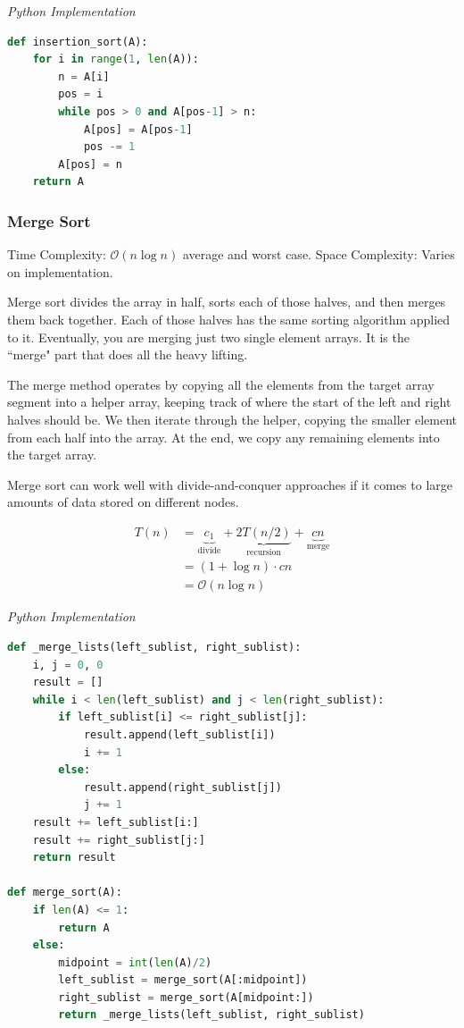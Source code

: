\documentclass{article}
\newcommand{\bigO}{\mathcal{O}}
\begin{document}
\vspace{8pt} \emph{Python Implementation}
\begin{lstlisting}[language=Python]
def insertion_sort(A):
    for i in range(1, len(A)):
        n = A[i]
        pos = i
        while pos > 0 and A[pos-1] > n:
            A[pos] = A[pos-1]
            pos -= 1
        A[pos] = n
    return A
\end{lstlisting}

    \subsubsection{Merge Sort}
    Time Complexity: $\bigO( n \log n )$ average and worst case. Space Complexity: Varies on implementation. 
    
    Merge sort divides the array in half, sorts each of those halves, and then merges them back together. Each of those halves has the same sorting algorithm applied to it. Eventually, you are merging just two single element arrays. It is the ``merge" part that does all the heavy lifting.
    
    The merge method operates by copying all the elements from the target array segment into a helper array, keeping track of where the start of the left and right halves should be. We then iterate through the helper, copying the smaller element from each half into the array. At the end, we copy any remaining elements into the target array.
    
    Merge sort can work well with divide-and-conquer approaches if it comes to large amounts of data stored on different nodes. 
    
    \begin{align*}
        T(n) &= 
            \underbrace{c_1}_\text{divide}
            + \underbrace{2T(n/2)}_\text{recursion}
            + \underbrace{c  n}_\text{merge}\\
        &= (1 + \log n) \cdot cn\\
        &= \bigO(n \log n)
    \end{align*}
    

\vspace{8pt} \emph{Python Implementation}
\begin{lstlisting}[language=Python]
def _merge_lists(left_sublist, right_sublist):
    i, j = 0, 0
    result = []
    while i < len(left_sublist) and j < len(right_sublist):
        if left_sublist[i] <= right_sublist[j]:
            result.append(left_sublist[i])
            i += 1
        else:
            result.append(right_sublist[j])
            j += 1
    result += left_sublist[i:]
    result += right_sublist[j:]
    return result

def merge_sort(A):
    if len(A) <= 1:
        return A
    else:
        midpoint = int(len(A)/2)
        left_sublist = merge_sort(A[:midpoint])
        right_sublist = merge_sort(A[midpoint:])
        return _merge_lists(left_sublist, right_sublist)
\end{lstlisting}
    
\end{document}
